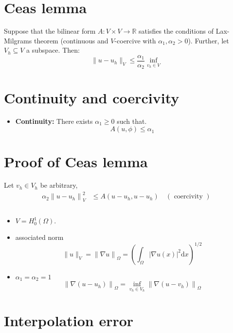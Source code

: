 \documentclass[openany,a4paper,11pt]{memoir}
\theoremstyle{definition}
\begin{document}
\section{Cea\textquotesingle s lemma}

Suppose that the bilinear form $A\colon V\times V\rightarrow\mathbb{R}$ satisfies the conditions of \linebreak Lax-Milgram\textquotesingle s theorem (continuous and $V$-coercive with $\alpha_{1},\alpha_{2}>0$). Further, let $V_{h}\subseteq V$ a subspace. Then: \[ \|u-u_{h}\|_{V}\le \frac{\alpha_{1}}{\alpha_{2}}\inf_{v_h\in V}\]

\section{Continuity and coercivity}

\begin{itemize}
\item \textbf{Continuity:} There exists $\alpha_{1}\ge 0$ such that. \[ A\left(u,\phi\right)\le\alpha_{1} \]
\end{itemize}

\section{Proof of Cea\textquotesingle s lemma}

Let $v_{h}\in V_{h}$ be arbitrary,
\begin{align*}
  \alpha_{2}{\|u-u_{h}\|}^{2}_{V}&\le A\left(u-u_{h}, u-u_{h}\right)\quad (\text{ coercivity })\\
  &\\
\end{align*}

\begin{itemize}
\item $V=H^{1}_{0}(\Omega)$.
\item associated norm \[ \|u\|_{V}={\|\nabla u\|}_{\Omega}={\left(\int_{\Omega}{|\nabla u(x)|}^{2}\mathrm{d}x\right)}^{1/2} \]
\item $\alpha_{1}=\alpha_{2}=1$ \[ {\|\nabla\left(u-u_{h}\right)\|}_{\Omega}=\inf_{v_h\in V_h}{\|\nabla\left(u-v_h\right)\|}_{\Omega} \]
\end{itemize}

\section{Interpolation error}
\end{document}
